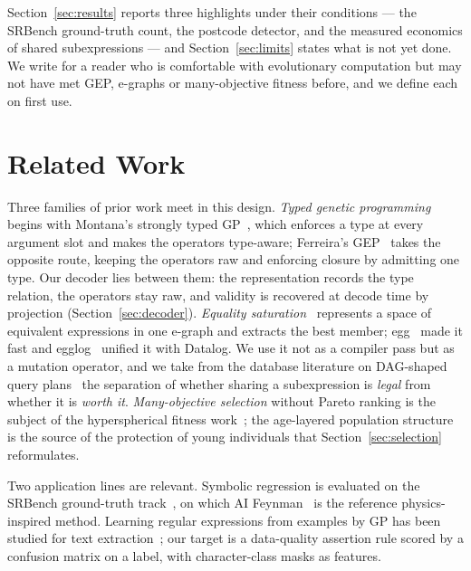 \documentclass[sigconf,nonacm]{acmart}
\begin{document}
Section~\ref{sec:results} reports three highlights under their conditions ---
the SRBench ground-truth count, the postcode detector, and the measured economics
of shared subexpressions --- and Section~\ref{sec:limits} states what is not yet
done. We write for a reader who is comfortable with evolutionary computation but
may not have met GEP, e-graphs or many-objective fitness before, and we define
each on first use.

\section{Related Work}
\label{sec:related}

Three families of prior work meet in this design. \emph{Typed genetic
programming} begins with Montana's strongly typed GP~\cite{montana1995stgp},
which enforces a type at every argument slot and makes the operators type-aware;
Ferreira's GEP~\cite{ferreira2001gep} takes the opposite route, keeping the
operators raw and enforcing closure by admitting one type. Our decoder lies
between them: the representation records the type relation, the operators stay
raw, and validity is recovered at decode time by projection
(Section~\ref{sec:decoder}). \emph{Equality saturation}~\cite{tate2009equality}
represents a space of equivalent expressions in one e-graph and extracts the
best member; egg~\cite{willsey2021egg} made it fast and egglog~\cite{egglog}
unified it with Datalog. We use it not as a compiler pass but as a mutation
operator, and we take from the database literature on DAG-shaped query
plans~\cite{neumann2009dag} the separation of whether sharing a subexpression is
\emph{legal} from whether it is \emph{worth it}. \emph{Many-objective selection}
without Pareto ranking is the subject of the hyperspherical fitness
work~\cite{morgan2026hff}; the age-layered population
structure~\cite{hornby2006alps} is the source of the protection of young
individuals that Section~\ref{sec:selection} reformulates.

Two application lines are relevant. Symbolic regression is evaluated on the
SRBench ground-truth track~\cite{lacava2021srbench}, on which AI
Feynman~\cite{udrescu2020aifeynman} is the reference physics-inspired method.
Learning regular expressions from examples by GP has been studied for text
extraction~\cite{bartoli2016regex}; our target is a data-quality assertion rule
scored by a confusion matrix on a label, with character-class masks as features.

\end{document}
